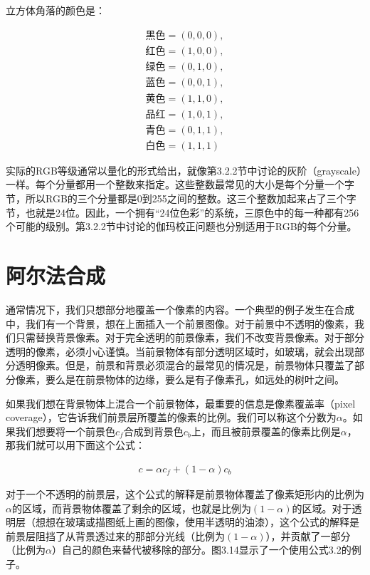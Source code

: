 \documentclass[lang=cn,12pt]{elegantbook}
\begin{document}
立方体角落的颜色是：

\[
  \begin{aligned}
    \mbox{黑色} = (0,0,0), \\
    \mbox{红色} = (1,0,0), \\
    \mbox{绿色} = (0,1,0), \\
    \mbox{蓝色} = (0,0,1), \\
    \mbox{黄色} = (1,1,0), \\
    \mbox{品红} = (1,0,1), \\
    \mbox{青色} = (0,1,1), \\
    \mbox{白色} = (1,1,1)
  \end{aligned}
\]

实际的RGB等级通常以量化的形式给出，就像第3.2.2节中讨论的灰阶（grayscale）一样。每个分量都用一个整数来指定。这些整数最常见的大小是每个分量一个字节，所以RGB的三个分量都是0到255之间的整数。这三个整数加起来占了三个字节，也就是24位。因此，一个拥有“24位色彩”的系统，三原色中的每一种都有256个可能的级别。第3.2.2节中讨论的伽玛校正问题也分别适用于RGB的每个分量。

\section{阿尔法合成}

通常情况下，我们只想部分地覆盖一个像素的内容。一个典型的例子发生在合成中，我们有一个背景，想在上面插入一个前景图像。对于前景中不透明的像素，我们只需替换背景像素。对于完全透明的前景像素，我们不改变背景像素。对于部分透明的像素，必须小心谨慎。当前景物体有部分透明区域时，如玻璃，就会出现部分透明像素。但是，前景和背景必须混合的最常见的情况是，前景物体只覆盖了部分像素，要么是在前景物体的边缘，要么是有子像素孔，如远处的树叶之间。

如果我们想在背景物体上混合一个前景物体，最重要的信息是像素覆盖率（pixel coverage），它告诉我们前景层所覆盖的像素的比例。我们可以称这个分数为$\alpha $。如果我们想要将一个前景色$c_f$合成到背景色$c_b$上，而且被前景覆盖的像素比例是$\alpha $，那我们就可以用下面这个公式：

\begin{align}
  c = \alpha c_f + (1 - \alpha )c_b
\end{align}

对于一个不透明的前景层，这个公式的解释是前景物体覆盖了像素矩形内的比例为$\alpha $的区域，而背景物体覆盖了剩余的区域，也就是比例为$(1-\alpha )$的区域。对于透明层（想想在玻璃或描图纸上画的图像，使用半透明的油漆），这个公式的解释是前景层阻挡了从背景透过来的那部分光线（比例为$(1-\alpha )$），并贡献了一部分（比例为$\alpha $）自己的颜色来替代被移除的部分。图3.14显示了一个使用公式3.2的例子。
\end{document}
